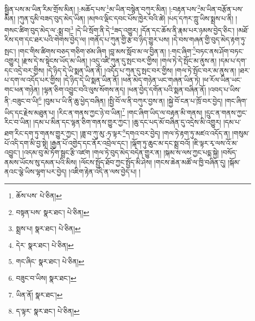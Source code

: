 སྦྱིན་པས་མ་ཡིན་རིམ་གྲོས་མིན། །:མཆོད་པས་\footnote{ཆོས་པས་  པེ་ཅིན། }མ་ཡིན་བསྙེན་བཀུར་མིན། །:བརྟན་པས་\footnote{བསྟན་པས་  སྣར་ཐང་།  པེ་ཅིན། }མ་ཡིན་བརྩོན་པས་མིན། །ཀུན་དུམི་བཟད་བུད་མེད་ཡིན། །མཁའ་ལྡིང་དབང་པོས་ཁྱེར་བའི་ཚེ། །པད་དཀར་ཀླུ་ཡིས་སྨྲས་པ་ནི། །གསང་ཚིག་བུད་མེད་ལ་:སྨྲ་བ།\footnote{སྨྲས་པ།  སྣར་ཐང་།  པེ་ཅིན། } །དེ་ཡི་སྲོག་ནི་དེ་\footnote{དེར་  སྣར་ཐང་།  པེ་ཅིན། }ཟད་འགྱུར། །དོན་དང་ཆོས་ནི་རྣམ་པར་ཉམས་བྱེད་ཅིང་། །མཐོ་རིས་དག་དང་ཐར་པའི་གེགས་བྱེད་ལ། །གནོད་པ་ཀུན་གྱི་རྩ་བ་ཉིད་གྱུར་པས། །དེ་བས་གཞན་གྱི་བུད་མེད་རྟག་ཏུ་སྤང་། །གང་གིས་ཚིགས་བཅད་གཅིག་ཙམ་ཞིག །བླ་མས་སློབ་མ་ལ་བྱིན་ན། །:གང་ཞིག་\footnote{གང་ཞིང་  སྣར་ཐང་།  པེ་ཅིན། }བཏང་ནས་ཤོག་བཏང་འགྱུར། །རྫས་དེ་ས་སྟེངས་ཡོད་མ་ཡིན། །འདུ་འཛི་ཀུན་དུ་སྤང་བར་གྱིས། །གལ་ཏེ་དེ་སྤོང་མ་ནུས་ན། །དམ་པ་དག་དང་འདྲེ་བར་གྱིས། །དེ་ཉིད་དེ་ཡི་སྨན་ཡིན་ནོ། །འདོད་པ་ཀུན་དུ་སྤང་བར་གྱིས། །གལ་ཏེ་སྤོང་བར་མ་ནུས་ན། །ཐར་པ་དག་ལ་འདོད་པར་གྱིས། །དེ་ཉིད་དེ་ཡི་སྨན་ཡིན་ནོ། །ཕན་མེད་གཉེན་ཡང་གཞན་ཡིན་ཏེ། །ཕ་རོལ་ཡིན་ཡང་གང་ཕན་གཉེན། །ལྷན་ཅིག་འབྱུང་བའི་ལུས་སོགས་ནད། །ཕན་བྱེད་དགོན་པའི་སྨན་བཞིན་ནོ། །འབད་པ་ཡིས་ནི་:བཟུང་བ་ཡི།\footnote{བཟུང་བ་ཡིས།  སྣར་ཐང་། } །བུམ་པ་ཡི་ནི་ཆུ་ཕྱེད་བཞིན། །སྤྱི་བོ་ལ་ནི་བཀུར་བྱས་ན། །སྐྱེ་བོ་ངན་པ་ཁྲོ་བར་བྱེད། །གང་ཞིག་ཡིད་དང་རྗེས་མཐུན་པ། །རིང་ན་གནས་ཀྱང་ཉེ་བ་ཡིན།\footnote{ཡིན་ནོ།  སྣར་ཐང་། } །གང་ཞིག་ཡིད་ལ་བརྟན་མི་གནས། །དྲུང་ན་གནས་ཀྱང་རིང་བ་ཡིན། །དམ་པ་མིན་དང་ལྷན་ཅིག་གནས་གྱུར་ཀྱང་། །ཆུ་དང་པད་མོ་བཞིན་དུ་འདྲེས་མི་འགྱུར། །དམ་པ་ཐག་རིང་དག་ཏུ་གནས་གྱུར་ཀྱང་། །ཟླ་བ་ཀུ་མུ་:ཏ་ལྟར་\footnote{ད་ལྟར་  སྣར་ཐང་།  པེ་ཅིན། }དགའ་བར་བྱེད། །གལ་ཏེ་རྟག་ཏུ་མཛའ་འདོད་ན། །གསུམ་པོ་འདི་དག་མི་བྱ་སྟེ། །རྒྱན་པོ་འགྱེད་དང་ནོར་འབྲེལ་དང་། །ལྐོག་ཏུ་ཆུང་མ་དང་སྨྲ་བའོ། །ཇི་ལྟར་རྭ་ལས་འོ་མ་འབྱུང་། །འདམ་བུ་མེ་ཏོག་སྦྲང་རྩི་འཛག །གལ་ཏེ་བུད་མེད་བདེན་གྱུར་ན། །སྐམ་ས་ལས་ཀྱང་པདྨ་སྐྱེ། །བསོད་ནམས་ཡོངས་སུ་དམན་པའི་མིས། །ལོངས་སྤྱོད་ཐོབ་ཀྱང་སྤྱོད་མི་ཤེས། །གངས་ཆེན་མཚོ་ལ་ཁྱི་བཞིན་དུ། །སྐོམ་ནའང་ལྕེ་ཡིས་ལྷག་པར་བྱེད། །འཇིག་རྟེན་འདི་ན་ལས་བྱེད་པ། །
